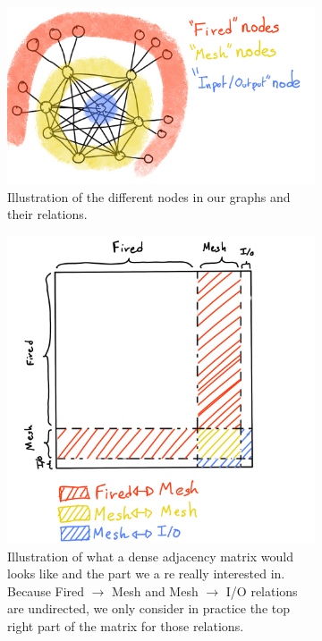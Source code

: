 \documentclass[../main.tex]{subfiles}
\begin{document}
\begin{figure}
  \centering
  \begin{subfigure}[t]{0.48\linewidth}
    \includegraphics[width=\linewidth]{images/jgnn/nodes_schema.png}
    \caption{Illustration of the different nodes in our graphs and their relations.}
    \label{fig:jgnn:node_schema}
  \end{subfigure}
  \hfill
  \begin{subfigure}[t]{0.48\linewidth}
    \includegraphics[width=\linewidth]{images/jgnn/adjacency_mat.png}
    \caption{Illustration of what a dense adjacency matrix would looks like and the part we a re really interested in. Because Fired $\rightarrow$ Mesh and Mesh $\rightarrow$ I/O relations are undirected, we only consider in practice the top right part of the matrix for those relations.}
    \label{fig:jgnn:adj}
  \end{subfigure}
  \caption{}
\end{figure}
\end{document}
